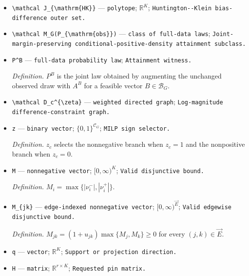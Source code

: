 \documentclass{article}
\begin{document}
\begin{itemize}
  \item \texttt{\textbackslash{}\allowbreak{}mathcal J\_\allowbreak{}\{\textbackslash{}\allowbreak{}mathrm\{HK\}\allowbreak{}\}\allowbreak{}} --- \texttt{polytope}; \(\mathbb R^K\); \texttt{Huntington-\allowbreak{}-\allowbreak{}Klein bias-\allowbreak{}difference outer set.}
  \item \texttt{\textbackslash{}\allowbreak{}mathcal M\_\allowbreak{}G(P\_\allowbreak{}\{\textbackslash{}\allowbreak{}mathrm\{obs\}\allowbreak{}\}\allowbreak{})} --- \texttt{class of full-\allowbreak{}data laws}; \texttt{Joint-\allowbreak{}margin-\allowbreak{}preserving conditional-\allowbreak{}positive-\allowbreak{}density attainment subclass.}
  \item \texttt{P\textasciicircum{}B} --- \texttt{full-\allowbreak{}data probability law}; \texttt{Attainment witness.}
  \par\smallskip\noindent\emph{Definition.} \(P^B\) is the joint law obtained by augmenting the unchanged observed draw with \(A^B\) for a feasible vector \(B\in\mathcal B_G\).
  \item \texttt{\textbackslash{}\allowbreak{}mathcal D\_\allowbreak{}c\textasciicircum{}\{\textbackslash{}\allowbreak{}zeta\}\allowbreak{}} --- \texttt{weighted directed graph}; \texttt{Log-\allowbreak{}magnitude difference-\allowbreak{}constraint graph.}
  \item \texttt{z} --- \texttt{binary vector}; \(\{0,1\}^{\mathcal C_G}\); \texttt{MILP sign selector.}
  \par\smallskip\noindent\emph{Definition.} \(z_c\) selects the nonnegative branch when \(z_c=1\) and the nonpositive branch when \(z_c=0\).
  \item \texttt{M} --- \texttt{nonnegative vector}; \([0,\infty)^K\); \texttt{Valid disjunctive bound.}
  \par\smallskip\noindent\emph{Definition.} \(M_i=\max\{|\nu^-_i|,|\nu^+_i|\}\).
  \item \texttt{M\_\allowbreak{}\{jk\}\allowbreak{}} --- \texttt{edge-\allowbreak{}indexed nonnegative vector}; \([0,\infty)^{\vec E}\); \texttt{Valid edgewise disjunctive bound.}
  \par\smallskip\noindent\emph{Definition.} \(M_{jk}=(1+u_{jk})\max\{M_j,M_k\}\ge0\) for every \((j,k)\in\vec E\).
  \item \texttt{q} --- \texttt{vector}; \(\mathbb R^K\); \texttt{Support or projection direction.}
  \item \texttt{H} --- \texttt{matrix}; \(\mathbb R^{r\times K}\); \texttt{Requested pin matrix.}

\end{itemize}
\end{document}
